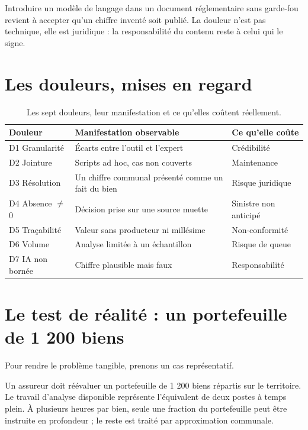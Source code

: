 Introduire un modèle de langage dans un document réglementaire sans garde-fou
revient à accepter qu'un chiffre inventé soit publié. La douleur n'est pas
technique, elle est juridique : la responsabilité du contenu reste à celui qui le
signe.

\section{Les douleurs, mises en regard}

\begin{table}[h]
\centering
\small
\begin{tabularx}{\textwidth}{@{}p{4.2cm}Xp{3.4cm}@{}}
\toprule
\textbf{Douleur} & \textbf{Manifestation observable} & \textbf{Ce qu'elle coûte} \\
\midrule
D1 Granularité & Écarts entre l'outil et l'expert & Crédibilité \\
D2 Jointure & Scripts ad hoc, cas non couverts & Maintenance \\
D3 Résolution & Un chiffre communal présenté comme un fait du bien & Risque juridique \\
D4 Absence \(\neq\) 0 & Décision prise sur une source muette & Sinistre non anticipé \\
D5 Traçabilité & Valeur sans producteur ni millésime & Non-conformité \\
D6 Volume & Analyse limitée à un échantillon & Risque de queue \\
D7 IA non bornée & Chiffre plausible mais faux & Responsabilité \\
\bottomrule
\end{tabularx}
\caption{Les sept douleurs, leur manifestation et ce qu'elles coûtent réellement.}
\end{table}

\section{Le test de réalité : un portefeuille de 1 200 biens}

Pour rendre le problème tangible, prenons un cas représentatif.

Un assureur doit réévaluer un portefeuille de 1 200 biens répartis sur le
territoire. Le travail d'analyse disponible représente l'équivalent de deux
postes à temps plein. À plusieurs heures par bien, seule une fraction du
portefeuille peut être instruite en profondeur ; le reste est traité par
approximation communale.

